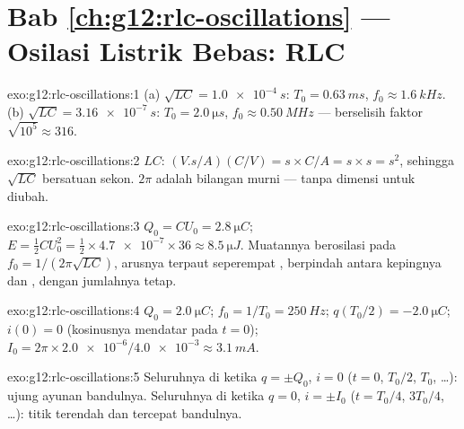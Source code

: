 \section*{Bab \ref{ch:g12:rlc-oscillations} --- Osilasi Listrik Bebas: RLC}

\begin{solution}{exo:g12:rlc-oscillations:1}
(a) $\sqrt{LC} = \qty{1.0e-4}{s}$: $T_0 = \qty{0.63}{ms}$,
$f_0 \approx \qty{1.6}{kHz}$. (b) $\sqrt{LC} = \qty{3.16e-7}{s}$:
$T_0 = \qty{2.0}{\micro s}$, $f_0 \approx \qty{0.50}{MHz}$ --- berselisih
faktor $\sqrt{10^5} \approx 316$.
\end{solution}

\begin{solution}{exo:g12:rlc-oscillations:2}
$LC$: $(\unit{V.s/A})(\unit{C/V}) = \unit{s} \times \unit{C/A} =
\unit{s} \times \unit{s} = \unit{s^2}$, sehingga $\sqrt{LC}$ bersatuan sekon.
$2\pi$ adalah bilangan murni --- tanpa dimensi untuk diubah.
\end{solution}

\begin{solution}{exo:g12:rlc-oscillations:3}
$Q_0 = CU_0 = \qty{2.8}{\micro C}$; $E = \tfrac12 CU_0^2 =
\tfrac12 \times \num{4.7e-7} \times 36 \approx \qty{8.5}{\micro J}$.
Muatannya berosilasi pada $f_0 = 1/(2\pi\sqrt{LC})$, arusnya terpaut seperempat
 ,  berpindah antara kepingnya dan , dengan
jumlahnya tetap.
\end{solution}

\begin{solution}{exo:g12:rlc-oscillations:4}
$Q_0 = \qty{2.0}{\micro C}$; $f_0 = 1/T_0 = \qty{250}{Hz}$;
$q(T_0/2) = \qty{-2.0}{\micro C}$; $i(0) = 0$ (kosinusnya mendatar pada $t=0$);
$I_0 = 2\pi \times \num{2.0e-6}/\num{4.0e-3} \approx \qty{3.1}{mA}$.
\end{solution}

\begin{solution}{exo:g12:rlc-oscillations:5}
Seluruhnya di  ketika $q = \pm Q_0$, $i = 0$ ($t = 0$, $T_0/2$,
$T_0$, \dots): ujung ayunan bandulnya. Seluruhnya di  ketika $q = 0$,
$i = \pm I_0$ ($t = T_0/4$, $3T_0/4$, \dots): titik terendah dan tercepat
bandulnya.
\end{solution}

